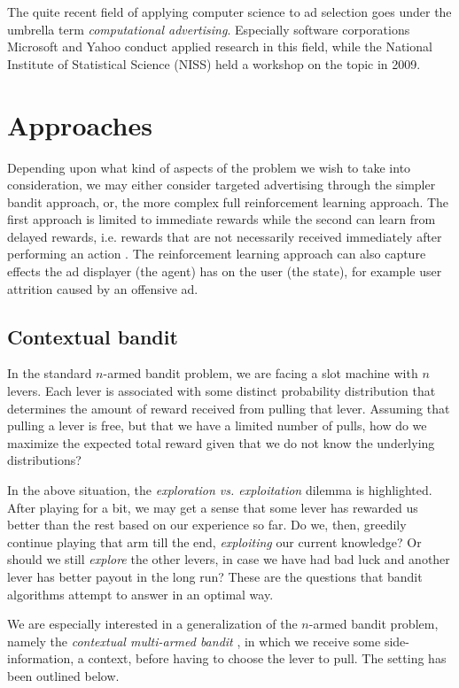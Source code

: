\documentclass{article} %
\begin{document}
The quite recent field of applying computer science to ad selection goes under
the umbrella term \emph{computational advertising}. Especially software
corporations Microsoft and Yahoo conduct applied research in this field, while
the National Institute of Statistical Science (NISS) held a workshop on the
topic in 2009. %

\section{Approaches}

Depending upon what kind of aspects of the problem we wish to take into
consideration, we may either consider targeted advertising through the simpler
bandit approach, or, the more complex full reinforcement learning approach. The
first approach is limited to immediate rewards while the second can learn from
delayed rewards, i.e. rewards that are not necessarily received immediately
after performing an action \cite{silver2013concurrent}. The reinforcement
learning approach can also capture effects the ad displayer (the agent) has
on the user (the state), for example user attrition caused by an offensive ad.



\subsection{Contextual bandit}

In the standard $n$-armed bandit problem, we are facing a slot machine with $n$
levers. Each lever is associated with some distinct probability distribution
that determines the amount of reward received from pulling that lever. Assuming
that pulling a lever is free, but that we have a limited number of pulls, how
do we maximize the expected total reward given that we do not know the
underlying distributions? \cite{book}

In the above situation, the \emph{exploration vs. exploitation} dilemma is
highlighted. After playing for a bit, we may get a sense that some lever has
rewarded us better than the rest based on our experience so far. Do we, then,
greedily continue playing that arm till the end, \emph{exploiting} our current
knowledge? Or should we still \emph{explore} the other levers, in case we have
had bad luck and another lever has better payout in the long run? These are the
questions that bandit algorithms attempt to answer in an optimal way.

We are especially interested in a generalization of the $n$-armed bandit
problem, namely the \emph{contextual multi-armed bandit}
\cite{langford2007epoch}, in which we receive some side-information, a context,
before having to choose the lever to pull. The setting has been outlined below.
\end{document}
